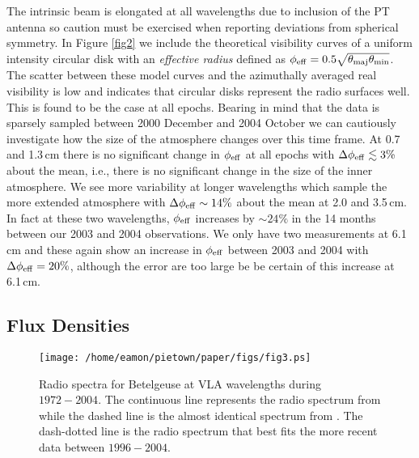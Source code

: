 \documentclass[iop]{emulateapj}
\begin{document}
The intrinsic beam is elongated at all wavelengths due to inclusion of the PT antenna so caution must be exercised when reporting deviations from spherical symmetry. In Figure \ref{fig2} we include the theoretical visibility curves of a uniform intensity circular disk with an \textit{effective radius} defined as $\phi _{\rm{eff}}=0.5\sqrt{\theta _{\rm{maj}}\theta _{\rm{min}}}$. The scatter between these model curves and the azimuthally averaged real visibility is low and indicates that circular disks represent the radio surfaces well. This is found to be the case at all epochs. Bearing in mind that the data is sparsely sampled between 2000 December and 2004 October we can cautiously investigate how the size of the atmosphere changes over this time frame. At 0.7 and 1.3\,cm there is no significant change in $\phi _{\rm{eff}}$ at all epochs with $\Delta \phi _{\rm{eff}} \lesssim 3\%$ about the mean, i.e., there is no significant change in the size of the inner atmosphere. We see more variability at longer wavelengths which sample the more extended atmosphere with $\Delta \phi _{\rm{eff}} \sim 14\%$ about the mean at 2.0 and 3.5\,cm. In fact at these two wavelengths, $\phi _{\rm{eff}}$ increases by $\sim 24\%$ in the 14 months between our 2003 and 2004 observations. We only have two measurements at 6.1\,cm and these again show an increase in $\phi _{\rm{eff}}$ between 2003 and 2004 with $\Delta \phi _{\rm{eff}} =20\%$, although the error are too large be be certain of this increase at 6.1\,cm.

\subsection{Flux Densities}
\begin{figure}
\texttt{[image: /home/eamon/pietown/paper/figs/fig3.ps]}
\caption{Radio spectra for Betelgeuse at VLA wavelengths during $1972 - 2004$. The continuous line represents the radio spectrum from \cite{newell_1982} while the dashed line is the almost identical spectrum from  \cite{drake_1992}. The dash-dotted line is the radio spectrum that best fits the more recent data between $1996 - 2004$.}
\label{fig3}
\end{figure}
\end{document}
